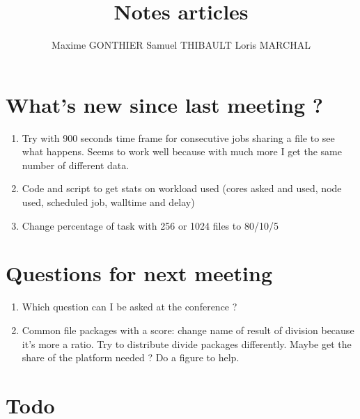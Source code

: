 \documentclass[a4paper]{article}
\title{Notes articles}
\author{Maxime GONTHIER Samuel THIBAULT Loris MARCHAL}
\begin{document}
\newpage

\section{What's new since last meeting ?}

	\begin{enumerate}
		\item Try with 900 seconds time frame for consecutive jobs sharing a file to see what happens. Seems to work well because with much more I get the same number of different data.
		\item Code and script to get stats on workload used (cores asked and used, node used, scheduled job, walltime and delay)
		\item Change percentage of task with 256 or 1024 files to 80/10/5
	\end{enumerate}
	
\section{Questions for next meeting}

	\begin{enumerate}
		\item Which question can I be asked at the conference ?
		\item Common file packages with a score: change name of result of division because it's more a ratio. Try to distribute divide packages differently. Maybe get the share of the platform needed ? Do a figure to help.
	\end{enumerate}

\section{Todo}
\end{document}
